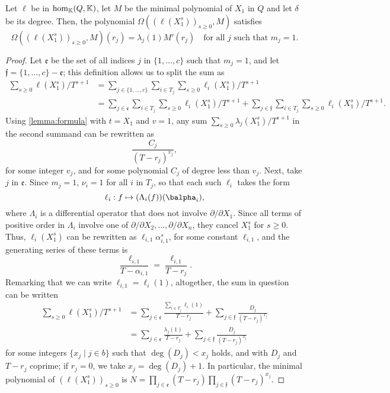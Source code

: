 \documentclass[12pt]{article}
\def\K{\mathbb{K}}
\def\K {\ensuremath{\mathbb{K}}}
\begin{document}
\begin{lemma}\label{lemma:valuelambda}
	Let $\ell$ be in ${\rm hom}_\K(Q,\K)$, let $M$ be the minimal
	polynomial of $X_1$ in $Q$ and let $\delta$ be its degree. Then, 
	the polynomial $\Omega((\ell(X_1^s))_{s\ge0},M)$ satisfies
	$$\Omega((\ell(X_1^s))_{s\ge0},M)(r_j) = \lambda_j(1) M'(r_j) \quad \text{for all $j$ such that $m_j=1$.}$$
	
\end{lemma}
\begin{proof}
	Let $\mathfrak{e}$ be the set of all indices $j$ in $\{1,\dots,c\}$
	such that $m_j=1$, and let $\mathfrak{f}=\{1,\dots,c\}-\mathfrak{e}$;
	this definition allows us to split the sum as
	\begin{align*}
	\sum_{s \ge 0} \ell(X_1^s)/T^{s+1}  
	&= \sum_{j \in \{1,\dots,c\}}\sum_{i\in T_j} 
	\sum_{s \ge 0}\ell_i(X_1^s)/T^{s+1}  \\
	&=\sum_{j \in \mathfrak{e}}\sum_{i\in T_j}\sum_{s \ge 0}  \ell_i(X_1^s)/T^{s+1} +
	\sum_{j \in \mathfrak{f}}\sum_{i\in T_j}\sum_{s \ge 0}  \ell_i(X_1^s)/T^{s+1}.
	\end{align*}
	Using \cref{lemma:formula} with $t=X_1$ and $v=1$, any sum $\sum_{s \ge 0} \lambda_j(X_1^s)/T^{s+1}$ 
	in the second summand
	can be rewritten as 
	$$\frac{C_j}{(T-r_j)^{v_j}},$$
	for some integer $v_j$, and for some polynomial $C_j$ of degree less than
	$v_j$. Next, take $j$ in $\mathfrak{e}$. Since $m_j=1$, $\nu_i=1$ for all $i$ in $T_j$,
	so that
	each such $\ell_i$ takes the form 
	$$\ell_i: f \mapsto (\Lambda_{i}(f))(\balpha_i),$$ where $\Lambda_{i}$
	is a differential operator that does not involve $\partial/\partial
	X_1$. Since all terms of positive order in $\Lambda_i$ involve one of
	$\partial/\partial X_2,\dots,\partial/\partial X_n$, they cancel
	$X_1^s$ for $s\ge 0$. Thus, $\ell_i(X_1^s)$ can be rewritten 
	as $\ell_{i,1} \alpha_{i,1}^s$, for some constant $\ell_{i,1}$,
	and the generating series of these terms is 
	$$\frac {\ell_{i,1}}{T-\alpha_{i,1}}=\frac {\ell_{i,1}}{T-r_j}.$$
	Remarking  that we can write $\ell_{i,1}=\ell_i(1)$,
	altogether, the sum in question can be written
	\begin{align*}
	\sum_{s \ge 0} \ell(X_1^s)/ T^{s+1}  
	&=\sum_{j \in \mathfrak{e}} 
	\frac{ \sum_{i\in T_j}  \ell_{i}(1) }{T-r_j }
	+ \sum_{j \in \mathfrak{f}} \frac{D_j}{(T-r_j )^{x_j}}\\
	&= \sum_{j \in \mathfrak{e}} 
	\frac{ \lambda_j(1) }{T-r_j }
	+ \sum_{j \in \mathfrak{f}} \frac{D_j}{(T-r_j )^{x_j}}
	\end{align*}
	for some integers $\{x_j \mid j \in b\}$ such that $\deg(D_j) < x_j$
	holds, and with $D_j$ and $T-r_j $ coprime; if $r_j=0$, we take
	$x_j=\deg(D_j)+1$. In particular, the minimal polynomial of
	$(\ell(X_1^s))_{s\ge 0}$ is $N=\prod_{j\in \mathfrak{e}}(T-r_j)
	\prod_{j \in \mathfrak{f}}(T-r_j)^{x_j}$.
	

\end{proof}
\end{document}
